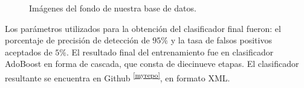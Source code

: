 \begin{figure}[h!]
\begin{center}
\quad 
{}\quad 
\end{center}
\caption{Imágenes del fondo de nuestra base de datos.}
\label{fig:ImagenFondo}
\end{figure}  

Los parámetros utilizados para la obtención del clasificador final fueron: el porcentaje de precisión de detección de $95 \%$ y la tasa de falsos positivos aceptados de $5 \%$. El resultado final del entrenamiento fue en clasificador AdoBoost en forma de cascada, que consta de diecinueve etapas. El clasificador resultante se encuentra en Github \textsuperscript{\ref{myrepo}}, en formato XML.  

